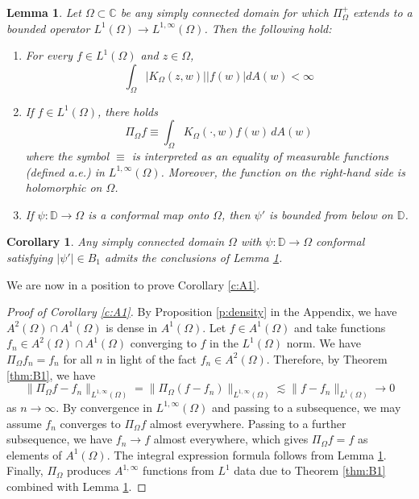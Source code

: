 \documentclass{amsart}
\newtheorem{lemma}[theorem]{Lemma}
\newtheorem{corollary}[theorem]{Corollary}
\theoremstyle{definition}
\numberwithin{equation}{section}
\begin{document}
\begin{lemma}\label{cor:AbsInt}
Let $\Omega \subset \mathbb{C}$ be any simply connected domain for which $\Pi_{\Omega}^+$ extends to a bounded operator $L^1(\Omega) \rightarrow L^{1,\infty}(\Omega)$. Then the following hold:
\begin{enumerate}
\item For every $f \in L^1(\Omega)$ and $z \in \Omega$,
\begin{equation*}
    \int_{\Omega}|K_{\Omega}(z,w)||f(w)|dA(w)<\infty \label{AbsInt}
\end{equation*}
\item If $f \in L^1(\Omega)$, there holds
\begin{equation*} \Pi_{\Omega}f \equiv \int_{\Omega}K_{\Omega}(\cdot,w)f(w)\,dA(w) \label{BergmanKernelL1Formula} \end{equation*}
where the symbol $\equiv$ is interpreted as an equality of measurable functions (defined a.e.) in $L^{1,\infty}(\Omega)$. Moreover, the function on the right-hand side is holomorphic on $\Omega$.
\item If $\psi\colon \mathbb{D} \rightarrow \Omega$ is a conformal map onto $\Omega$, then $\psi'$ is bounded from below on $\mathbb{D}$.
\end{enumerate}
\end{lemma}
\begin{corollary} \label{cor:B1DomainsAbsInt}
Any simply connected domain $\Omega$ with $\psi: \mathbb{D} \rightarrow \Omega $ conformal satisfying $|\psi'| \in B_1$ admits the conclusions of Lemma \ref{cor:AbsInt}.
\end{corollary}

We are now in a position to prove Corollary \ref{c:A1}.
\begin{proof}[Proof of Corollary \ref{c:A1}]
By Proposition \ref{p:density} in the Appendix, we have $A^2(\Omega) \cap A^1(\Omega) $ is dense in $A^1(\Omega)$.
Let $f \in A^1(\Omega)$ and take functions $f_n \in A^2(\Omega) \cap A^1(\Omega)$ converging to $f$ in the $L^1(\Omega)$ norm. We have $\Pi_\Omega f_n=f_n$ for all $n$ in light of the fact $f_n \in A^2(\Omega)$. Therefore, by Theorem \ref{thm:B1}, we have 
$$
\|\Pi_{\Omega} f- f_n\|_{L^{1,\infty}(\Omega)} = \|\Pi_{\Omega}(f-f_n) \|_{L^{1,\infty}(\Omega)} \lesssim \|f-f_n\|_{L^1(\Omega)} \rightarrow 0
$$
as $n \rightarrow \infty$. By convergence in $L^{1,\infty}(\Omega)$ and passing to a subsequence, we may assume $f_n$ converges to $\Pi_{\Omega}f$ almost everywhere. Passing to a further subsequence, we have $f_n \rightarrow f$ almost everywhere, which gives $\Pi_{\Omega}f=f$ as elements of $A^1(\Omega)$. The integral expression formula follows from Lemma \ref{cor:AbsInt}. Finally, $\Pi_\Omega$ produces $A^{1,\infty}$ functions from $L^1$ data due to Theorem \ref{thm:B1} combined with Lemma \ref{cor:AbsInt}. 
\end{proof} 
\end{document}
